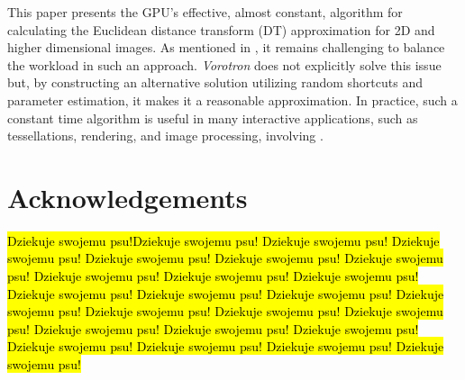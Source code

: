 \documentclass[format=acmsmall,screen,review,authordraft,nonacm]{acmart}
\newcommand{\ourjfa}{Vorotron} %
\begin{document}
This paper presents the GPU's effective, almost constant, algorithm for calculating the Euclidean distance transform (DT) approximation for 2D and higher dimensional images.
%
As mentioned in \cite{cao2010parallel}, it remains challenging to balance the workload in such an approach.
%
\textit{\ourjfa} does not explicitly solve this issue but, by constructing an alternative solution utilizing random shortcuts and parameter estimation, it makes it a reasonable approximation.
%
In practice, such a constant time algorithm is useful in many interactive applications, such as tessellations, rendering, and image processing, involving \cite{rong2006jump}.

\section{Acknowledgements} %

\hl{Dziekuje swojemu psu!Dziekuje swojemu psu! Dziekuje swojemu psu! Dziekuje swojemu psu! Dziekuje swojemu psu! Dziekuje swojemu psu! Dziekuje swojemu psu! Dziekuje swojemu psu! Dziekuje swojemu psu! Dziekuje swojemu psu! Dziekuje swojemu psu! Dziekuje swojemu psu! Dziekuje swojemu psu! Dziekuje swojemu psu! Dziekuje swojemu psu! Dziekuje swojemu psu! Dziekuje swojemu psu! Dziekuje swojemu psu! Dziekuje swojemu psu! Dziekuje swojemu psu! Dziekuje swojemu psu! Dziekuje swojemu psu! Dziekuje swojemu psu! Dziekuje swojemu psu!  }




\end{document}
